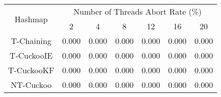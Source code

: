 \begin{tabular}{|c|c|c|c|c|c|c|}
\hline
\multirow{2}{*}{Hashmap} & \multicolumn{6}{c|}{Number of Threads Abort Rate (\%)}\\\cline{2-7}& 2 & 4 & 8 & 12 & 16 & 20\\
\hline
\hline
T-Chaining & 0.000 & 0.000 & 0.000 & 0.000 & 0.000 & 0.000\\
T-CuckooIE & 0.000 & 0.000 & 0.000 & 0.000 & 0.000 & 0.000\\
T-CuckooKF & 0.000 & 0.000 & 0.000 & 0.000 & 0.000 & 0.000\\
NT-Cuckoo & 0.000 & 0.000 & 0.000 & 0.000 & 0.000 & 0.000\\
\hline
\end{tabular}
